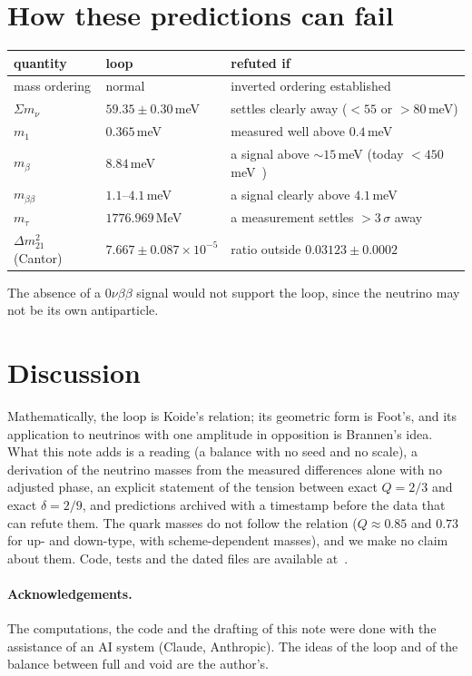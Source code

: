 \documentclass[11pt,a4paper]{article}
\begin{document}
\section{How these predictions can fail}
\begin{center}\small
\begin{tabular}{lll}
\toprule
quantity & loop & refuted if \\
\midrule
mass ordering & normal & inverted ordering established \\
$\Sigma m_\nu$ & $59.35\pm0.30$\,meV & settles clearly away (${<}55$ or ${>}80$\,meV) \\
$m_1$ & $0.365$\,meV & measured well above $0.4$\,meV \\
$m_\beta$ & $8.84$\,meV & a signal above ${\sim}15$\,meV (today ${<}450$\,meV~\cite{katrin}) \\
$m_{\beta\beta}$ & $1.1$--$4.1$\,meV & a signal clearly above $4.1$\,meV \\
$m_\tau$ & $1776.969$\,MeV & a measurement settles ${>}3\,\sigma$ away \\
$\Delta m^2_{21}$ (Cantor) & $7.667\pm0.087\times10^{-5}$ & ratio outside $0.03123\pm0.0002$ \\
\bottomrule
\end{tabular}
\end{center}
The absence of a $0\nu\beta\beta$ signal would not support the loop, since the neutrino may not be its own antiparticle.

\section{Discussion}
Mathematically, the loop is Koide's relation; its geometric form is Foot's, and its application to neutrinos with one
amplitude in opposition is Brannen's idea. What this note adds is a reading (a balance with no seed and no scale), a
derivation of the neutrino masses from the measured differences alone with no adjusted phase, an explicit statement of
the tension between exact $Q=2/3$ and exact $\delta=2/9$, and predictions archived with a timestamp before the data
that can refute them. The quark masses do not follow the relation ($Q\approx0.85$ and $0.73$ for up- and down-type,
with scheme-dependent masses), and we make no claim about them. Code, tests and the dated files are available
at~\cite{grm}.

\paragraph{Acknowledgements.} The computations, the code and the drafting of this note were done with the assistance of
an AI system (Claude, Anthropic). The ideas of the loop and of the balance between full and void are the author's.
\end{document}

